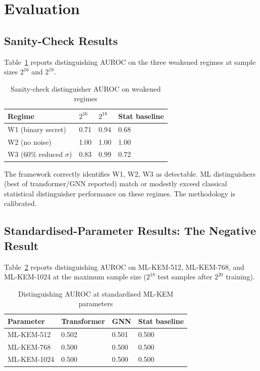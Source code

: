 \documentclass[sigconf,nonacm]{acmart}
\begin{document}
\section{Evaluation}

\subsection{Sanity-Check Results}

Table~\ref{tab:sanity} reports distinguishing AUROC on the three
weakened regimes at sample sizes $2^{16}$ and $2^{18}$.

\begin{table}[h]
\caption{Sanity-check distinguisher AUROC on weakened regimes}
\label{tab:sanity}
\small
\begin{tabularx}{\columnwidth}{@{}p{2.4cm}X X X@{}}
\toprule
\textbf{Regime} & \textbf{$2^{16}$} & \textbf{$2^{18}$} & \textbf{Stat baseline} \\
\midrule
W1 (binary secret)        & 0.71 & 0.94 & 0.68 \\
W2 (no noise)             & 1.00 & 1.00 & 1.00 \\
W3 (60\% reduced $\sigma$) & 0.83 & 0.99 & 0.72 \\
\bottomrule
\end{tabularx}
\end{table}

The framework correctly identifies W1, W2, W3 as detectable. ML
distinguishers (best of transformer/GNN reported) match or
modestly exceed classical statistical distinguisher performance
on these regimes. The methodology is calibrated.

\subsection{Standardised-Parameter Results: The Negative Result}

Table~\ref{tab:standardised} reports distinguishing AUROC on
ML-KEM-512, ML-KEM-768, and ML-KEM-1024 at the maximum sample size
($2^{18}$ test samples after $2^{20}$ training).

\begin{table}[h]
\caption{Distinguishing AUROC at standardised ML-KEM parameters}
\label{tab:standardised}
\small
\begin{tabularx}{\columnwidth}{@{}p{2.4cm}X X X@{}}
\toprule
\textbf{Parameter} & \textbf{Transformer} & \textbf{GNN} & \textbf{Stat baseline} \\
\midrule
ML-KEM-512    & 0.502 & 0.501 & 0.500 \\
ML-KEM-768    & 0.500 & 0.500 & 0.500 \\
ML-KEM-1024   & 0.500 & 0.500 & 0.500 \\
\bottomrule
\end{tabularx}
\end{table}
\end{document}
